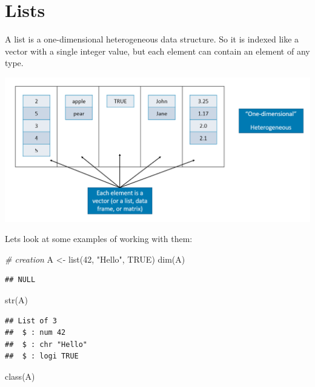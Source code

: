 \documentclass[
]{book}
\newenvironment{Shaded}{\begin{snugshade}}{\end{snugshade}}
\newcommand{\CommentTok}[1]{\textcolor[rgb]{0.56,0.35,0.01}{\textit{#1}}}
\newcommand{\ConstantTok}[1]{\textcolor[rgb]{0.00,0.00,0.00}{#1}}
\newcommand{\DecValTok}[1]{\textcolor[rgb]{0.00,0.00,0.81}{#1}}
\newcommand{\FunctionTok}[1]{\textcolor[rgb]{0.00,0.00,0.00}{#1}}
\newcommand{\NormalTok}[1]{#1}
\newcommand{\OtherTok}[1]{\textcolor[rgb]{0.56,0.35,0.01}{#1}}
\newcommand{\StringTok}[1]{\textcolor[rgb]{0.31,0.60,0.02}{#1}}
\theoremstyle{definition}
\theoremstyle{definition}
\theoremstyle{definition}
\theoremstyle{definition}
\theoremstyle{remark}
\begin{document}
\hypertarget{lists}{%
\section{Lists}\label{lists}}

A list is a one-dimensional heterogeneous data structure. So it is indexed like a vector with a single integer value, but each element can contain an element of any type.

\includegraphics[width=14.5in]{png/List}

Lets look at some examples of working with them:

\begin{Shaded}
\begin{Highlighting}[]
\CommentTok{\# creation}
\NormalTok{A }\OtherTok{\textless{}{-}} \FunctionTok{list}\NormalTok{(}\DecValTok{42}\NormalTok{, }\StringTok{"Hello"}\NormalTok{, }\ConstantTok{TRUE}\NormalTok{)}
\FunctionTok{dim}\NormalTok{(A)}
\end{Highlighting}
\end{Shaded}

\begin{verbatim}
## NULL
\end{verbatim}

\begin{Shaded}
\begin{Highlighting}[]
\FunctionTok{str}\NormalTok{(A)}
\end{Highlighting}
\end{Shaded}

\begin{verbatim}
## List of 3
##  $ : num 42
##  $ : chr "Hello"
##  $ : logi TRUE
\end{verbatim}

\begin{Shaded}
\begin{Highlighting}[]
\FunctionTok{class}\NormalTok{(A)}
\end{Highlighting}
\end{Shaded}
\end{document}
